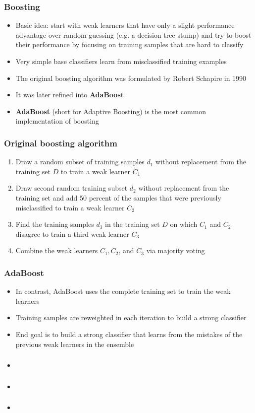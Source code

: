 \documentclass{beamer}
\begin{document}
\begin{frame}
  \frametitle{Boosting}
  \begin{itemize}
  \item Basic idea: start with weak learners that have only a slight performance advantage over random guessing (e.g. a decision tree stump) and try to boost their performance by focusing on training samples that are hard to classify
  \item Very simple base classifiers learn from misclassified training examples
  \item The original boosting algorithm was formulated by Robert Schapire in 1990
  \item It was later refined into \textbf{AdaBoost}
  \item \textbf{AdaBoost} (short for Adaptive Boosting) is the most common implementation of boosting
  \end{itemize}
\end{frame}

\begin{frame}
  \frametitle{Original boosting algorithm}
  \begin{enumerate}
  \item Draw a random subset of training samples $d_1$ without replacement from the training set $D$ to train a weak learner $C_1$
  \item Draw second random training subset $d_2$ without replacement from the training set and add 50 percent of the samples that were previously misclassified to train a weak learner $C_2$
  \item Find the training samples $d_3$ in the training set $D$ on which $C_1$ and $C_2$ disagree to train a third weak learner $C_3$
  \item Combine the weak learners $C_1, C_2$, and $C_3$ via majority voting
  \end{enumerate}
\end{frame}

\begin{frame}
  \frametitle{AdaBoost}
  \begin{itemize}
  \item In contrast, AdaBoost uses the complete training set to train the weak learners
  \item Training samples are reweighted in each iteration to build a strong classifier
  \item End goal is to build a strong classifier that learns from the mistakes of the previous weak learners in the ensemble
  \end{itemize}
\end{frame}

\begin{frame}
  \frametitle{}
  \begin{itemize}
  \item
  \end{itemize}
\end{frame}

\begin{frame}
  \frametitle{}
  \begin{itemize}
  \item
  \end{itemize}
\end{frame}

\begin{frame}
  \frametitle{}
  \begin{itemize}
  \item
  \end{itemize}
\end{frame}
\end{document}
